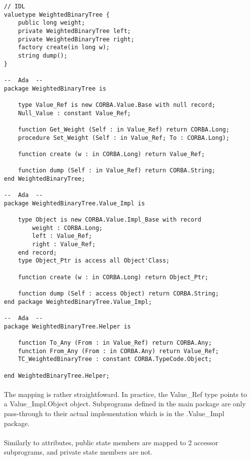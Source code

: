 \begin{verbatim}
// IDL
valuetype WeightedBinaryTree {
	public long weight;
	private WeightedBinaryTree left;
	private WeightedBinaryTree right;
	factory create(in long w);
	string dump();
}

--  Ada  --
package WeightedBinaryTree is

	type Value_Ref is new CORBA.Value.Base with null record;
	Null_Value : constant Value_Ref;

	function Get_Weight (Self : in Value_Ref) return CORBA.Long;
	procedure Set_Weight (Self : in Value_Ref; To : CORBA.Long);

	function create (w : in CORBA.Long) return Value_Ref;

	function dump (Self : in Value_Ref) return CORBA.String;
end WeightedBinaryTree;

--  Ada  --
package WeightedBinaryTree.Value_Impl is

	type Object is new CORBA.Value.Impl_Base with record
		weight : CORBA.Long;
		left : Value_Ref;
		right : Value_Ref;
	end record;
	type Object_Ptr is access all Object'Class;

	function create (w : in CORBA.Long) return Object_Ptr;

	function dump (Self : access Object) return CORBA.String;
end package WeightedBinaryTree.Value_Impl;

--  Ada  --
package WeightedBinaryTree.Helper is

	function To_Any (From : in Value_Ref) return CORBA.Any;
	function From_Any (From : in CORBA.Any) return Value_Ref;
	TC_WeightedBinaryTree : constant CORBA.TypeCode.Object;

end WeightedBinaryTree.Helper;
\end{verbatim}

\paragraph{} The mapping is rather straightfoward. In practice, the
Value\_Ref type points to a Value\_\-Impl.Object object. Subprograms
defined in the main package are only pass-through to their actual
implementation which is in the .Value\_Impl package.

\paragraph{}Similarly to attributes, public state members are mapped
to 2 accessor subprograms, and private state members are not.

